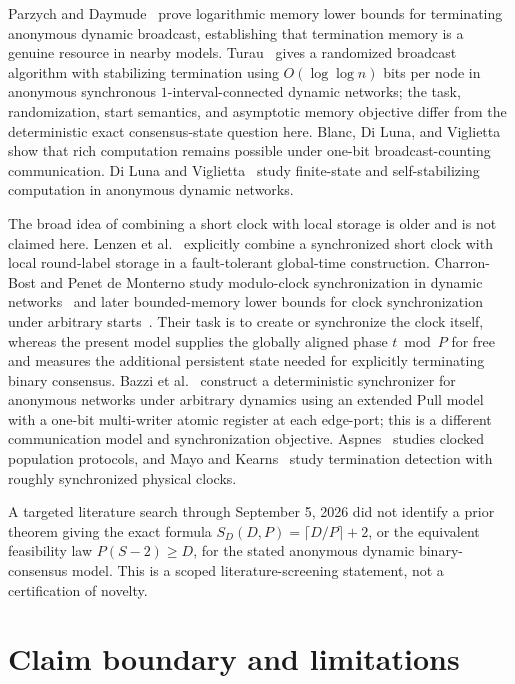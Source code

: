 \documentclass[11pt]{article}
\theoremstyle{remark}
\begin{document}
Parzych and Daymude~\cite{parzych2026} prove logarithmic memory lower bounds for terminating anonymous dynamic broadcast, establishing that termination memory is a genuine resource in nearby models.  Turau~\cite{turau2026} gives a randomized broadcast algorithm with stabilizing termination using $O(\log\log n)$ bits per node in anonymous synchronous $1$-interval-connected dynamic networks; the task, randomization, start semantics, and asymptotic memory objective differ from the deterministic exact consensus-state question here.  Blanc, Di Luna, and Viglietta~\cite{blanc2026} show that rich computation remains possible under one-bit broadcast-counting communication.  Di Luna and Viglietta~\cite{diluna2026} study finite-state and self-stabilizing computation in anonymous dynamic networks.

The broad idea of combining a short clock with local storage is older and is not claimed here.  Lenzen et al.~\cite{lenzen2013} explicitly combine a synchronized short clock with local round-label storage in a fault-tolerant global-time construction.  Charron-Bost and Penet de Monterno study modulo-clock synchronization in dynamic networks~\cite{charron2023} and later bounded-memory lower bounds for clock synchronization under arbitrary starts~\cite{charron2024bounded}.  Their task is to create or synchronize the clock itself, whereas the present model supplies the globally aligned phase $t\bmod P$ for free and measures the additional persistent state needed for explicitly terminating binary consensus.  Bazzi et al.~\cite{bazzi2025} construct a deterministic synchronizer for anonymous networks under arbitrary dynamics using an extended Pull model with a one-bit multi-writer atomic register at each edge-port; this is a different communication model and synchronization objective.  Aspnes~\cite{aspnes2021} studies clocked population protocols, and Mayo and Kearns~\cite{mayo1994} study termination detection with roughly synchronized physical clocks.

A targeted literature search through September 5, 2026 did not identify a prior theorem giving the exact formula $S_D(D,P)=\lceil D/P\rceil+2$, or the equivalent feasibility law $P(S-2)\ge D$, for the stated anonymous dynamic binary-consensus model.  This is a scoped literature-screening statement, not a certification of novelty.

\section{Claim boundary and limitations}
\end{document}
